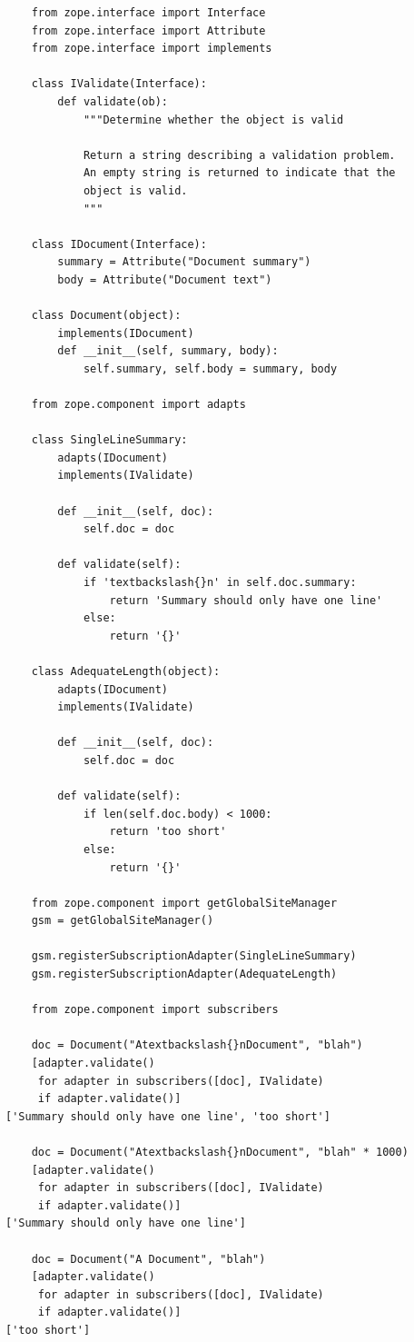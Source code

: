 \documentclass[a4paper,openany,twoside,final]{book}
\begin{document}
\begin{verbatim}
    from zope.interface import Interface
    from zope.interface import Attribute
    from zope.interface import implements

    class IValidate(Interface):
        def validate(ob):
            """Determine whether the object is valid

            Return a string describing a validation problem.
            An empty string is returned to indicate that the
            object is valid.
            """

    class IDocument(Interface):
        summary = Attribute("Document summary")
        body = Attribute("Document text")

    class Document(object):
        implements(IDocument)
        def __init__(self, summary, body):
            self.summary, self.body = summary, body

    from zope.component import adapts

    class SingleLineSummary:
        adapts(IDocument)
        implements(IValidate)

        def __init__(self, doc):
            self.doc = doc

        def validate(self):
            if 'textbackslash{}n' in self.doc.summary:
                return 'Summary should only have one line'
            else:
                return '{}'

    class AdequateLength(object):
        adapts(IDocument)
        implements(IValidate)

        def __init__(self, doc):
            self.doc = doc

        def validate(self):
            if len(self.doc.body) < 1000:
                return 'too short'
            else:
                return '{}'

    from zope.component import getGlobalSiteManager
    gsm = getGlobalSiteManager()

    gsm.registerSubscriptionAdapter(SingleLineSummary)
    gsm.registerSubscriptionAdapter(AdequateLength)

    from zope.component import subscribers

    doc = Document("Atextbackslash{}nDocument", "blah")
    [adapter.validate()
     for adapter in subscribers([doc], IValidate)
     if adapter.validate()]
['Summary should only have one line', 'too short']

    doc = Document("Atextbackslash{}nDocument", "blah" * 1000)
    [adapter.validate()
     for adapter in subscribers([doc], IValidate)
     if adapter.validate()]
['Summary should only have one line']

    doc = Document("A Document", "blah")
    [adapter.validate()
     for adapter in subscribers([doc], IValidate)
     if adapter.validate()]
['too short']
\end{verbatim}
\end{document}
